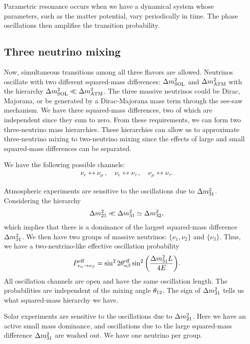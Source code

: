 \documentclass[twocolumn]{article}
\newcommand{\na}{\ensuremath{\nu_\alpha}}
\newcommand{\nb}{\ensuremath{\nu_\beta}}
\renewcommand{\a}{\ensuremath{\alpha}}
\renewcommand{\b}{\ensuremath{\beta}}
\renewcommand{\ne}{\ensuremath{\nu_e}}
\newcommand{\nm}{\ensuremath{\nu_\mu}}
\newcommand{\nt}{\ensuremath{\nu_\tau}}
\renewcommand{\th}[1][]{%
  \theta\ifx\\#1\\\else_\text{#1}\fi
}
\renewcommand{\t}[1]{\ensuremath{\text{{#1}}}}
\newcommand*{\dm}[1][]{%
  \Delta m^2\ifx\\#1\\\else_\text{#1}\fi
}
\begin{document}
Parametric resonance occurs when we have a dynamical system whose parameters, such as the matter potential, vary periodically in time. The phase oscillations then amplifies the transition probability.

\subsection*{Three neutrino mixing}
Now, simultaneous transitions among all three flavors are allowed.
Neutrinos oscillate with two different squared-mass differences: $\dm[SOL]$ and $\dm[ATM]$ with the hierarchy $\dm[SOL] \ll \dm[ATM]$. The three massive neutrinos could be Dirac, Majorana, or be generated by a Dirac-Majorana mass term through the see-saw mechanism. We have three squared-mass differences, two of which are independent since they sum to zero. From these requirements, we can form two three-neutrino mass hierarchies. These hierarchies can allow us to approximate three-neutrino mixing to two-neutrino mixing since the effects of large and small squared-mass differences can be separated.

We have the following possible channels:
\begin{align*}
  \ne \leftrightarrow \nm\,, \quad \ne \leftrightarrow \nt\,, \quad \nm \leftrightarrow \nt
.\end{align*}

Atmospheric experiments are sensitive to the oscillations due to $\dm[31]$. Considering the hierarchy
\begin{align*}
  \dm[21] \ll \dm[31] \simeq \dm[32]
,\end{align*}
which implies that there is a dominance of the largest squared-mass difference $\dm[31]$. We then have two groups of massive neutrinos: $\{\nu_\t{1}, \nu_\t{2}\}$ and $\{\nu_\t{3}\}$. Thus, we have a two-neutrino-like effective oscillation probability
\begin{align*}
  P^\t{eff}_{\na \to \nb} = \sin^2{2 \th^\t{eff}_{\a\b}} \sin^2{\left( \frac{\dm[31]L}{4E} \right)}
.\end{align*}
All oscillation channels are open and have the same oscillation length. The probabilities are independent of the mixing angle $\th[12]$. The sign of $\dm[31]$ tells us what squared-mass hierarchy we have. 

Solar experiments are sensitive to the oscillations due to $\dm[21]$. Here we have an active small mass dominance, and oscillations due to the large squared-mass difference $\dm[31]$ are washed out. We have one neutrino per group.
\end{document}
